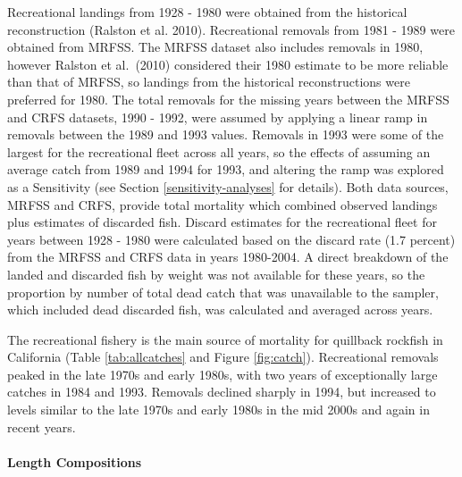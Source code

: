 \documentclass[11pt,
  english,
  a4paper,
]{article}
\begin{document}
Recreational landings from 1928 - 1980 were obtained from the historical reconstruction {(Ralston et al. 2010)\leavevmode\tagmcend\tagstructend}. Recreational removals from 1981 - 1989 were obtained from MRFSS. The MRFSS dataset also includes removals in 1980, however Ralston et al.~{(2010)\leavevmode\tagmcend\tagstructend} considered their 1980 estimate to be more reliable than that of MRFSS, so landings from the historical reconstructions were preferred for 1980. The total removals for the missing years between the MRFSS and CRFS datasets, 1990 - 1992, were assumed by applying a linear ramp in removals between the 1989 and 1993 values. Removals in 1993 were some of the largest for the recreational fleet across all years, so the effects of assuming an average catch from 1989 and 1994 for 1993, and altering the ramp was explored as a Sensitivity (see Section \ref{sensitivity-analyses} for details). Both data sources, MRFSS and CRFS, provide total mortality which combined observed landings plus estimates of discarded fish. Discard estimates for the recreational fleet for years between 1928 - 1980 were calculated based on the discard rate (1.7 percent) from the MRFSS and CRFS data in years 1980-2004. A direct breakdown of the landed and discarded fish by weight was not available for these years, so the proportion by number of total dead catch that was unavailable to the sampler, which included dead discarded fish, was calculated and averaged across years.

\leavevmode\tagmcend\tagstructend\par


The recreational fishery is the main source of mortality for quillback rockfish in California (Table \ref{tab:allcatches} and Figure \ref{fig:catch}). Recreational removals peaked in the late 1970s and early 1980s, with two years of exceptionally large catches in 1984 and 1993. Removals declined sharply in 1994, but increased to levels similar to the late 1970s and early 1980s in the mid 2000s and again in recent years.

\leavevmode\tagmcend\tagstructend\par


\hypertarget{length-compositions-1}{%
\paragraph{Length Compositions}\label{length-compositions-1}}
\end{document}

